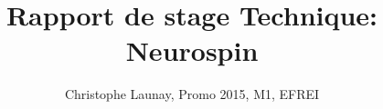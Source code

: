 \documentclass[12pt]{report}
\title{Rapport de stage Technique:
	Neurospin}
\author{Christophe Launay, Promo 2015, M1, EFREI}
\begin{document}
	
\maketitle

\listoftodos

\tableofcontents








\end{document}
